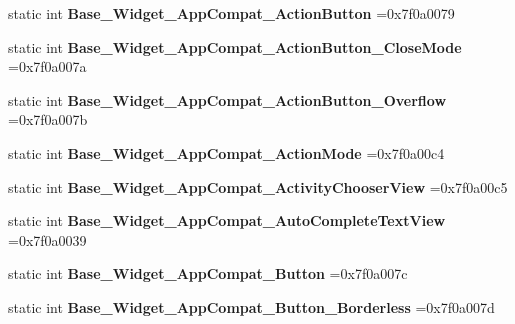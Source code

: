 \begin{DoxyCompactItemize}
static int {\bfseries Base\+\_\+\+Widget\+\_\+\+App\+Compat\+\_\+\+Action\+Button} =0x7f0a0079
\item 
\mbox{\label{classandroid_1_1support_1_1design_1_1R_1_1style_aa4a8a0571ca8483bcb5511ec6c4cc7f0}} 
static int {\bfseries Base\+\_\+\+Widget\+\_\+\+App\+Compat\+\_\+\+Action\+Button\+\_\+\+Close\+Mode} =0x7f0a007a
\item 
\mbox{\label{classandroid_1_1support_1_1design_1_1R_1_1style_accc048b45e5a6c1c17e5dc8d3b9847cf}} 
static int {\bfseries Base\+\_\+\+Widget\+\_\+\+App\+Compat\+\_\+\+Action\+Button\+\_\+\+Overflow} =0x7f0a007b
\item 
\mbox{\label{classandroid_1_1support_1_1design_1_1R_1_1style_a3359d922428ecea041ff9fb89a9be956}} 
static int {\bfseries Base\+\_\+\+Widget\+\_\+\+App\+Compat\+\_\+\+Action\+Mode} =0x7f0a00c4
\item 
\mbox{\label{classandroid_1_1support_1_1design_1_1R_1_1style_afe6b58323680277b626633bb43cbad0b}} 
static int {\bfseries Base\+\_\+\+Widget\+\_\+\+App\+Compat\+\_\+\+Activity\+Chooser\+View} =0x7f0a00c5
\item 
\mbox{\label{classandroid_1_1support_1_1design_1_1R_1_1style_af75332b3e29e627a5d97bd126bb66e6f}} 
static int {\bfseries Base\+\_\+\+Widget\+\_\+\+App\+Compat\+\_\+\+Auto\+Complete\+Text\+View} =0x7f0a0039
\item 
\mbox{\label{classandroid_1_1support_1_1design_1_1R_1_1style_ae3dbbcd4b808fbacb1be99c2869f2807}} 
static int {\bfseries Base\+\_\+\+Widget\+\_\+\+App\+Compat\+\_\+\+Button} =0x7f0a007c
\item 
\mbox{\label{classandroid_1_1support_1_1design_1_1R_1_1style_a9b33b6b1092a6c30ebc1bceea808ac16}} 
static int {\bfseries Base\+\_\+\+Widget\+\_\+\+App\+Compat\+\_\+\+Button\+\_\+\+Borderless} =0x7f0a007d
\item 
\mbox{\label{classandroid_1_1support_1_1design_1_1R_1_1style_a6210e3ba46a656de600c6ead474e9881}} 

\end{DoxyCompactItemize}
